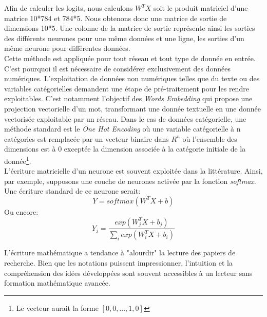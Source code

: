 \noindent Afin de calculer les logits, nous calculons $W^TX$ soit le produit matriciel d'une matrice 10*784 et 784*5. Nous obtenons donc une matrice de sortie de dimensions 10*5. Une colonne de la matrice de sortie représente ainsi les sorties des différents neurones pour une même données et une ligne, les sorties d'un même neurone pour différentes données.\\

\noindent Cette méthode est appliquée pour tout réseau et tout type de donnée en entrée. C'est pourquoi il est nécessaire de considérer exclusivement des données numériques. L'exploitation de données non numériques telles que du texte ou des variables catégorielles demandent une étape de pré-traitement pour les rendre exploitables. C'est notamment l'objectif des \textit{Words Embedding} qui propose une projection vectorielle d'un mot, transformant une donnée textuelle en une donnée vectorisée exploitable par un réseau. Dans le cas de données catégorielle, une méthode standard est le \textit{One Hot Encoding} où une variable catégorielle à n catégories est remplacée par un vecteur binaire dans $R^n$ où l'ensemble des dimensions est à 0 exceptée la dimension associée à la catégorie initiale de la donnée\footnote{Le vecteur aurait la forme $[0, 0, ... , 1, 0]$}.\\

\noindent L'écriture matricielle d'un neurone est souvent exploitée dans la littérature. Ainsi, par exemple, supposons une couche de neurones activée par la fonction \textit{softmax}. Une écriture standard de ce neurone serait:
$$Y=softmax(W^TX+b)$$
Ou encore:
$$Y_j = \frac{exp(W_j^TX+b_j)}{\sum_iexp(W_i^TX+b_i)}$$

\noindent L'écriture mathématique a tendance à "alourdir" la lecture des papiers de recherche. Bien que les notations puissent impressionner, l'intuition et la compréhension des idées développées sont souvent accessibles à un lecteur sans formation mathématique avancée.
